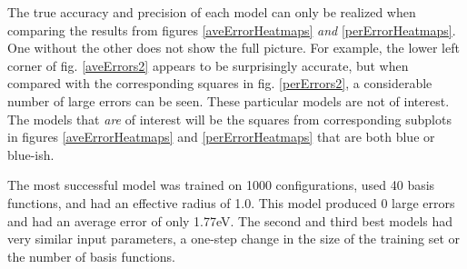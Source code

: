 \par The true accuracy and precision of each model can only be realized when comparing the results from figures \ref{aveErrorHeatmaps} \textit{and} \ref{perErrorHeatmaps}. One without the other does not show the full picture. For example, the lower left corner of fig. \ref{aveErrors2} appears to be surprisingly accurate, but when compared with the corresponding squares in fig. \ref{perErrors2}, a considerable number of large errors can be seen. These particular models are not of interest. The models that \textit{are} of interest will be the squares from corresponding subplots in figures \ref{aveErrorHeatmaps} and \ref{perErrorHeatmaps} that are both blue or blue-ish. 
\par The most successful model was trained on 1000 configurations, used 40 basis functions, and had an effective radius of 1.0. This model produced 0 large errors and had an average error of only 1.77eV. The second and third best models had very similar input parameters, a one-step change in the size of the training set or the number of basis functions.
